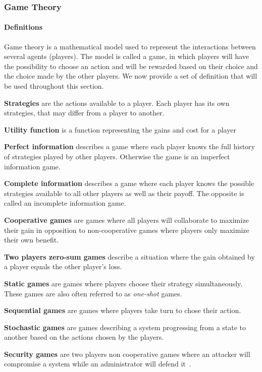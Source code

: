 \subsubsection{Game Theory}


\paragraph{Definitions}
Game theory is a mathematical model used to represent the interactions between several agents (\ie players).
The model is called a game, in which players will have the possibility to choose an action and will be rewarded based on their choice and the choice made by the other players.
We now provide a set of definition that will be used throughout this section.

\textbf{Strategies} are the actions available to a player. Each player has its own strategies, that may differ from a player to another.

\textbf{Utility function} is a function representing the gains and cost for a player

\textbf{Perfect information} describes a game where each player knows the full history of strategies played by other players. Otherwise the game is an imperfect information game.

\textbf{Complete information} describes a game where each player knows the possible strategies available to all other players as well as their payoff. The opposite is called an incomplete information game.

\textbf{Cooperative games} are games where all players will collaborate to maximize their gain in opposition to non-cooperative games where players only maximize their own benefit.

\textbf{Two players zero-sum games} describe a situation where the gain obtained by a player equals the other player's loss.

\textbf{Static games} are games where players choose their strategy simultaneously. These games are also often referred to as \textit{one-shot} games.

\textbf{Sequential games} are games where players take turn to chose their action.

\textbf{Stochastic games} are games describing a system progressing from a state to another based on the actions chosen by the players.

\textbf{Security games} are two players non cooperative games where an attacker will compromise a system while an administrator will defend it~\cite{book-gt}.

